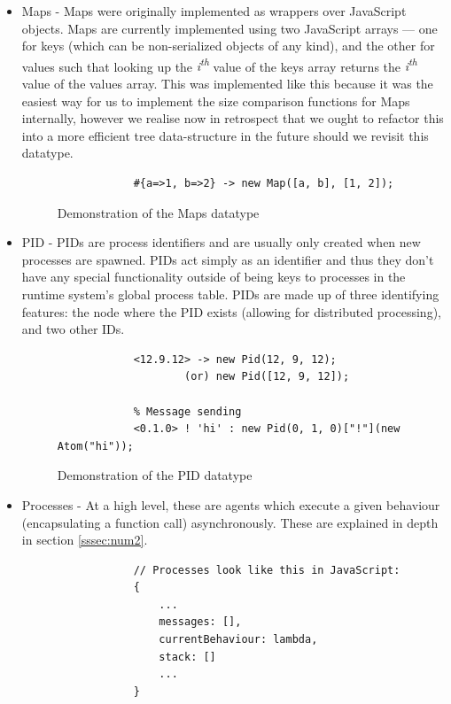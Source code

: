 \documentclass[twoside,12pt,titlepage,a4paper]{article}
\begin{document}
\begin{itemize}
	\item Maps - Maps were originally implemented as wrappers over JavaScript objects. Maps are currently implemented using two JavaScript arrays --- one for keys (which can be non-serialized objects of any kind), and the other for values such that looking up the \textit{i\textsuperscript{th}} value of the keys array returns the \textit{i\textsuperscript{th}} value of the values array. This was implemented like this because it was the easiest way for us to implement the size comparison functions for Maps internally, however we realise now in retrospect that we ought to refactor this into a more efficient tree data-structure in the future should we revisit this datatype.
	\begin{figure}[H]
	\begin{verbatim}
	        #{a=>1, b=>2} -> new Map([a, b], [1, 2]);
	\end{verbatim}
	\caption{Demonstration of the Maps datatype}
	\end{figure}

	\item PID - PIDs are process identifiers and are usually only created when new processes are spawned. PIDs act simply as an identifier and thus they don't have any special functionality outside of being keys to processes in the runtime system's global process table. PIDs are made up of three identifying features: the node where the PID exists (allowing for distributed processing), and two other IDs.
	\begin{figure}[H]
	\begin{verbatim}
	        <12.9.12> -> new Pid(12, 9, 12);
	                (or) new Pid([12, 9, 12]);
	        
	        % Message sending
	        <0.1.0> ! 'hi' : new Pid(0, 1, 0)["!"](new Atom("hi"));
	\end{verbatim}
	\caption{Demonstration of the PID datatype}
	\end{figure}

	\item Processes - At a high level, these are agents which execute a given behaviour (encapsulating a function call) asynchronously. These are explained in depth in section \ref{sssec:num2}.
	\begin{figure}[H]
	\begin{verbatim}
	        // Processes look like this in JavaScript:
	        {
	            ...
	            messages: [],
	            currentBehaviour: lambda,
	            stack: []
	            ...
	        }


\end{verbatim}
\end{figure}
\end{itemize}
\end{document}
